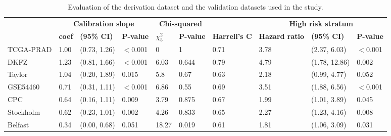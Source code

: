 \documentclass[twocolumn]{bmcart}%
\begin{document}
\begin{table}[ht!]
\caption{Evaluation of the derivation dataset and the validation datasets used in the study.}
\begin{tabular}{llllllllll}
\\
 & \multicolumn{3}{c}{\textbf{Calibration slope}} & \multicolumn{2}{c}{\textbf{Chi-squared}} & & \multicolumn{3}{c}{\textbf{High risk stratum}}
\\ \cmidrule(lr){2-4}\cmidrule(lr){5-6}\cmidrule(lr){8-10}
 & \textbf{coef} & \textbf{(95\% CI)} & \textbf{P-value} & \textbf{\(\chi^2_5\)} & \textbf{P-value} & \textbf{Harrell's C} & \textbf{Hazard ratio} & \textbf{(95\% CI)} & \textbf{P-value}
\\
\toprule
TCGA-PRAD & 1.00 & (0.73, 1.26) & $<$0.001 & 0 & 1 & 0.71 & 3.78 & (2.37, 6.03) &	$<$0.001
\\
DKFZ & 1.23 & (0.81, 1.66) & $<$0.001 & 6.03 & 0.644 & 0.79 & 4.79 & (1.78, 12.86) &	0.002
\\
Taylor & 1.04 & (0.20, 1.89) & 0.015 & 5.8 & 0.67 & 0.63 & 2.18 & (0.99, 4.77) &	0.052
\\
GSE54460 & 0.71 & (0.31, 1.11) & $<$0.001 & 6.86 & 0.55 & 0.69 & 3.51 & (1.88, 6.56)	 & $<$0.001
\\
CPC & 0.64 & (0.16, 1.11) & 0.009 & 3.79 & 0.875 & 0.67 & 1.99 & (1.01, 3.89) & 0.045
\\
Stockholm & 0.62 & (0.23, 1.01) & 0.002 & 4.26 & 0.833 & 0.65 & 2.27 & (1.23, 4.16) & 0.008
\\
Belfast & 0.34 & (0.00, 0.68) & 0.051 & 18.27 & 0.019 & 0.61 & 1.81 & (1.06, 3.09) & 0.031
\\
\toprule
\end{tabular}
\label{tab:external_validation}
\end{table}
\end{document}
